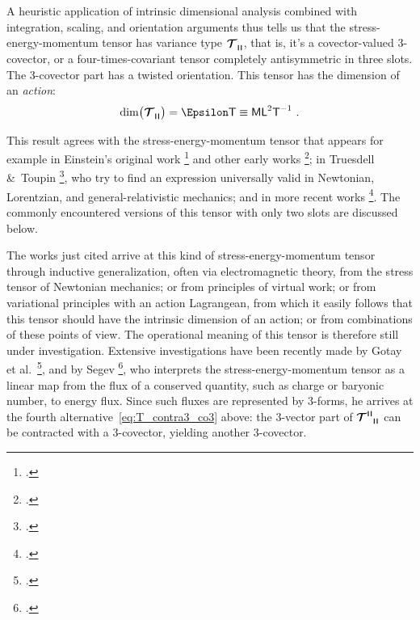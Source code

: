 \documentclass[\ifafour a4paper,12pt,\else a5paper,10pt,\fi%
onecolumn,oneside,article,%
british%
]{memoir}
\makeatletter
\theoremstyle{remark}
\theoremstyle{innote}
\newcommand*{\mathte}[1]{\textbf{\textit{\textsf{#1}}}}
\newcommand*{\citep}{\footcites}
\newcommand*{\amp}{\&}
\renewcommand*{\|}[1][]{\nonscript\,#1\vert\nonscript\;\mathopen{}}
\newcommand*{\sect}{\S}%
\newcommand*{\sects}{\S\S}%
\newcommand*{\chap}{ch.}%
\newcommand*{\eg}{{e.g.}}
\newcommand*{\etal}{{et al.}}
\newcommand*{\q}{}%
\DeclareRobustCommand*{\q}{%
  \mathord{\mathpalette\bigcdot@{}}%
}
\newcommand*{\bigcdot@scalefactor}{0.7}
\newcommand*{\bigcdot@widthfactor}{1.5}
\newcommand*{\bigcdot@}[2]{%
  \sbox0{$#1\vcenter{}$}%
  \sbox2{$#1\cdot\m@th$}%
  \hbox to \bigcdot@widthfactor\wd2{%
    \hfil
    \raise\ht0\hbox{%
      \scalebox{\bigcdot@scalefactor}{%
        \lower\ht0\hbox{$#1\bullet\m@th$}%
      }%
    }%
    \hfil
  }%
}
\newcommand*{\Le}{\textsf{L}}
\newcommand*{\Ti}{\textsf{T}}
\newcommand*{\Ma}{\textsf{M}}
\newcommand*{\En}{\Epsilon}%
\newcommand*{\yT}{\bm{\mathcal{T}}}
\renewcommand*{\i}{\indices}
\newcommand*{\rul}{{\mkern2mu\rule[-0.1ex]{0.75pt}{1.1ex}\mkern2mu}}
\DeclarePairedDelimiter\mul{\rul}{\rul}%
\makeatother
\begin{document}
\medskip

A heuristic application of intrinsic dimensional analysis combined with
integration, scaling, and orientation arguments thus tells us that the
stress-energy-momentum tensor has variance type $\yT\i{_{\q\mul{\q\q\q}}}$,
that is, it's a covector-valued 3-covector, or a four-times-covariant
tensor completely antisymmetric in three slots. The 3-covector part has a
twisted orientation. This tensor has the dimension of an \emph{action}:
\begin{equation}
    \label{eq:final_dim_T}
  \dim\bigl(\yT\i{_{\q \mul{\q\q\q}}}\bigr) = \En\Ti \equiv \Ma\Le^{2}\Ti^{-1} \ .
\end{equation}


\medskip

This result agrees with the stress-energy-momentum tensor that appears for
example in Einstein's original work \citep[\sect~C.9]{einstein1914b} and
other early works
\citep[\eg][\sects~IV.54--55]{pauli1921_t1958}[\sect~13]{cartan1923}[\sect~7]{brillouin1924}[\sects~VII.2,\,8]{fokker1960_t1965};
in Truesdell \amp\ Toupin \citep[\sect~F.IV.288]{truesdelletal1960}, who
try to find an expression universally valid in Newtonian, Lorentzian, and
general-relativistic mechanics; and in more recent works \citep[\chap~14
Exercise~14.18, \chap~15,
\sect~21.3]{misneretal1970_r1973}[\sect~3.3]{hawkingetal1973_r1994}{hehletal1986,gotayetal1992,gronwaldetal1997,castrillonlopezetal2008,castrillonlopezetal2009}[see
also][for similar conclusions in general manifolds and in Newtonian
mechanics]{segevetal1999,kansoetal2007}. The commonly encountered versions
of this tensor with only two slots are discussed below.

The works just cited arrive at this kind of stress-energy-momentum tensor
through inductive generalization, often via electromagnetic theory, from
the stress tensor of Newtonian mechanics; or from principles of virtual
work; or from variational principles with an action Lagrangean, from which
it easily follows that this tensor should have the intrinsic dimension of
an action; or from combinations of these points of view. The operational
meaning of this tensor is therefore still under investigation. Extensive
investigations have been recently made by Gotay \etal\
\citep{gotayetal1998,gotayetal2004,gotayetal2006}, and by Segev
\citep{segev2002}[see also][]{segev2000b}, who interprets the
stress-energy-momentum tensor as a linear map from the flux of a conserved
quantity, such as charge or baryonic number, to energy flux. Since such
fluxes are represented by 3-forms, he arrives at the fourth
alternative~\eqref{eq:T_contra3_co3} above: the 3-vector part of
$\yT\i{^{\mul{\q\q\q}}_{\mul{\q\q\q}}}$ can be contracted with a
3-covector, yielding another 3-covector.
\end{document}
